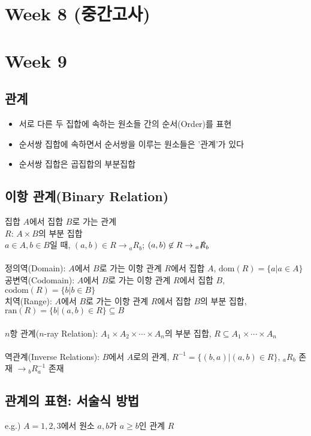 \section{Week 8 (중간고사)}
\newpage
\section{Week 9}
\subsection{관계}
\begin{itemize}
    \item 서로 다른 두 집합에 속하는 원소들 간의 순서(Order)를 표현
    \item 순서쌍 집합에 속하면서 순서쌍을 이루는 원소들은 '관계'가 있다
    \item 순서쌍 집합은 곱집합의 부분집합
\end{itemize}

\subsection{이항 관계(Binary Relation)}
집합 $A$에서 집합 $B$로 가는 관계\\
$R$: $A \times B$의 부분 집합\\
$a \in A, b \in B$일 때, $(a, b) \in R \to {_aR_b}$; $(a, b) \not\in R \to {_a\slashed{R}_b}$
\\\\
정의역(Domain): $A$에서 $B$로 가는 이항 관계 $R$에서 집합 $A$, $\mathrm{dom}(R) = \{a | a \in A\}$\\
공변역(Codomain): $A$에서 $B$로 가는 이항 관계 $R$에서 집합 $B$, $\mathrm{codom}(R) = \{b | b \in B\}$\\
치역(Range): $A$에서 $B$로 가는 이항 관계 $R$에서 집합 $B$의 부분 집합, $\mathrm{ran}(R) = \{b | (a, b) \in R\} \subseteq B$
\\\\
$n$항 관계($n$-ray Relation): $A_1 \times A_2 \times \cdots \times A_n$의 부분 집합, $R \subseteq A_1 \times \cdots \times A_n$
\\\\
역관계(Inverse Relations): $B$에서 $A$로의 관계, $R^{-1} = \{(b, a) | (a, b) \in R\}$, $_aR_b$ 존재 $\to {_bR^{-1}_a}$ 존재

\subsection{관계의 표현: 서술식 방법}
e.g.) $A={1, 2, 3}$에서 원소 $a, b$가 $a \geq b$인 관계 $R$

